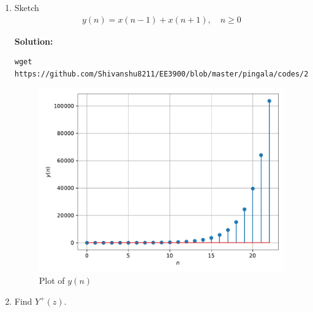\documentclass[journal,12pt,twocolumn]{IEEEtran}
\newcommand{\solution}{\noindent \textbf{Solution: }}
\providecommand{\brak}[1]{\ensuremath{\left(#1\right)}}
\providecommand{\sbrak}[1]{\ensuremath{\left[#1\right]}}
\numberwithin{equation}{section}
\renewcommand\thesection{\arabic{section}}
\begin{document}
\begin{enumerate}[label=\thesection.\arabic*,ref=\thesection.\theenumi]
\solution Expanding $X^+(z)$ in \eqref{eq:X-z} using partial fractions, we get
\begin{align}
    X^+(z) &= \frac{1}{\brak{\alpha - \beta}z^{-1}}\sbrak{\frac{1}{1 - \alpha z^{-1}} - \frac{1}{1 - \beta z^{-1}}} \\
           &= \frac{1}{\brak{\alpha - \beta}}\sum_{n = 0}^{\infty}\brak{\alpha^n - \beta^n}z^{-n + 1} \\
           &= \sum_{n = 1}^{\infty}\frac{\alpha^{n} - \beta^{n}}{\alpha - \beta}z^{-n + 1} \\
           &= \sum_{k = 0}^{\infty}\frac{\alpha^{k + 1} - \beta^{k + 1}}{\alpha - \beta}z^{-k}
\end{align}
where $k := n + 1$. Thus,
\begin{align}
    x(n) = \frac{\alpha^{n + 1} - \beta^{n + 1}}{\alpha - \beta}u(n) = a_{n + 1}u(n)
    \label{eq:x-n-def}
\end{align}
	\item Sketch 
\begin{align}
	y(n) = x\brak{n-1} + x\brak{n+1},  \quad n \ge 0
	\label{eq:10-orig-diff-rev}
\end{align}

\solution
\begin{lstlisting}
wget https://github.com/Shivanshu8211/EE3900/blob/master/pingala/codes/2.2.py
\end{lstlisting}

\begin{figure}[!ht]
    \includegraphics[width=\columnwidth]{figs/2.2}
   \caption{Plot of $y(n)$}
  \label{fig:yn}
\end{figure}
\item Find $Y^{+}(z)$. 


\end{enumerate}
\end{document}

